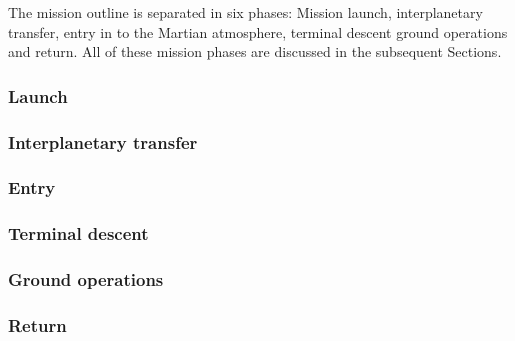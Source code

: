 The mission outline is separated in six phases: Mission launch, interplanetary transfer, entry in to the Martian atmosphere, terminal descent ground operations and return. All of these mission phases are discussed in the subsequent Sections.

\subsubsection{Launch} \label{sec:launch}


\subsubsection{Interplanetary transfer} \label{sec:interplanetary}


\subsubsection{Entry} \label{sec:entry}


\subsubsection{Terminal descent} \label{sec:terminal}


\subsubsection{Ground operations} \label{sec:groundop}


\subsubsection{Return} \label{sec:return}






